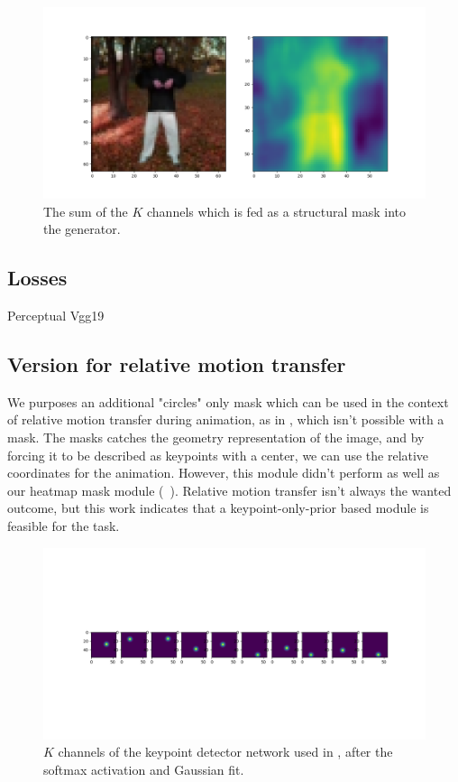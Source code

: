 \documentclass{article}
\begin{document}
\begin{figure}[ht]
\vskip 0.2in
\begin{center}
\centerline{\includegraphics[width=\columnwidth]{mask_sum}}
\caption{
The sum of the $K$ channels which is fed as a structural mask into the
generator.
}
\label{mask-sum}
\end{center}
\vskip -0.2in
\end{figure}


\subsection{Losses}
Perceptual Vgg19 \cite{simonyan2015deep}
\subsection{Version for relative motion transfer}
We purposes an additional "circles" only mask
which can be used in the context
of relative motion transfer during animation, as in
\cite{siarohin2020order}, which isn't possible with a mask.
The masks catches the geometry representation \cite{wu2019transgaga} of the
image, and by forcing it to be described as keypoints with a center, we can
use the relative coordinates for the animation. However, this module didn't
perform as well as our heatmap mask module (~\label{table:results}).
Relative motion transfer isn't always the wanted outcome, but this work
indicates that a keypoint-only-prior based module is feasible for the task.


\begin{figure}[ht]
\vskip 0.2in
\begin{center}
\centerline{\includegraphics[width=\columnwidth]{softmax_10kp}}
\caption{
$K$ channels of the keypoint detector network used in
\cite{siarohin2020order}, after the softmax activation and Gaussian fit.
}
\label{softmax-10kp}
\end{center}
\vskip -0.2in
\end{figure}
\end{document}
